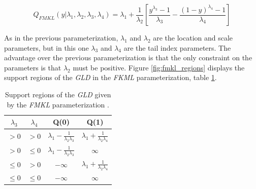 \begin{equation}\label{eq:fmkl_param}
Q_{FMKL}(y|\lambda_{1}, \lambda_{2}, \lambda_{3}, \lambda_{4})=\lambda_{1}+\frac{1}{\lambda_{2}}\left[\frac{y^{\lambda_{3}}-1}{\lambda_{3}} - \frac{(1-y)^{\lambda_{4}}-1}{\lambda_{4}} \right] 
\end{equation}

As in the previous parameterization, $\lambda_{1}$ and $\lambda_{2}$ are the location and scale parameters, but in this one $\lambda_{3}$ and $\lambda_{4}$ are the tail index parameters. The advantage over the previous parameterization is that the only constraint on the parameters is that $\lambda_{2}$ must be positive. Figure \ref{fig:fmkl_regions} displays the support regions of the \textit{GLD} in the \textit{FKML} parameterization, table \ref{tab:fmkl_conts}.

\begin{table}[]
\centering
\caption{Support regions of the \textit{GLD} given by the \textit{FMKL} parameterization \cite{Marcondes2018}.}
\label{tab:fmkl_conts}
\begin{tabular}{c|c|c|c}
\hline
$\lambda_{3}$ & $\lambda_{4}$ & Q(0)                                           & Q(1)                                           \\ \hline
$>0$          & $>0$          & $\lambda_{1}-\frac{1}{\lambda_{2}\lambda_{3}}$ & $\lambda_{1}+\frac{1}{\lambda_{2}\lambda_{4}}$ \\ \hline
$>0$          & $\leq0$         & $\lambda_{1}-\frac{1}{\lambda_{2}\lambda_{3}}$ & $\infty$                                       \\ \hline
$\leq0$         & $>0$          & $-\infty$                                      & $\lambda_{1}+\frac{1}{\lambda_{2}\lambda_{4}}$ \\ \hline
$\leq0$         & $\leq0$         & $-\infty$                                      & $\infty$                                       \\ \hline
\end{tabular}
\end{table}

